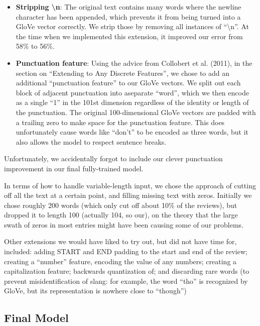 \documentclass{article}
\newenvironment{itemizedense}{
\begin{itemize}
  \setlength{\itemsep}{1pt}
  \setlength{\parskip}{0pt}
  \setlength{\parsep}{0pt}
}{\end{itemize}}
\begin{document}
\begin{itemizedense}
\item \textbf{Stripping \textbackslash n}: The original text contains many words where the newline character has been appended, which prevents it from being turned into a GloVe vector correctly. We strip those by removing all instances of ``\textbackslash n''. At the time when we implemented this extension, it improved our error from 58\% to 56\%.

\item \textbf{Punctuation feature}: Using the advice from Collobert et al. (2011), in the section on ``Extending to Any Discrete Features'', we chose to add an additional ``punctuation feature'' to our GloVe vectors. We split out each block of adjacent punctuation into aseparate ``word'', which we then encode as a single ``1'' in the 101st dimension regardless of the identity or length of the punctuation. The original 100-dimensional GloVe vectors are padded with a trailing zero to make space for the punctuation feature. This does unfortunately cause words like ``don't'' to be encoded as three words, but it also allows the model to respect sentence breaks. 
\end{itemizedense}

Unfortunately, we accidentally forgot to include our clever punctuation improvement in our final fully-trained model.

In terms of how to handle variable-length input, we chose the approach of cutting off all the text at a certain point, and filling missing text with zeros. Initially we chose roughly 200 words (which only cut off about 10\% of the reviews), but dropped it to length 100 (actually 104, so our), on the theory that the large swath of zeros in most entries might have been causing some of our problems.

Other extensions we would have liked to try out, but did not have time for, included: adding START and END padding to the start and end of the review; creating a ``number'' feature, encoding the value of any numbers; creating a capitalization feature; backwards quantization of; and discarding rare words (to prevent misidentification of slang: for example, the word ``tho'' is recognized by GloVe, but its representation is nowhere close to ``though'')

\subsection*{Final Model}
\label{finalmodel}
\end{document}
